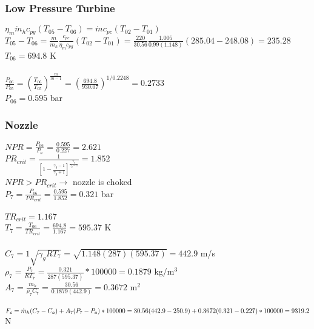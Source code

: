 \documentclass{article}
\begin{document}
\subsubsection*{Low Pressure Turbine}
$\eta_m \dot{m}_h c_{pg}(T_{05}-T_{06})=\dot{m} c_{pc}(T_{02}-T_{01})$ \\
$T_{05}-T_{06}=\frac{\dot{m}}{\dot{m}_h}\frac{c_{pc}}{\eta_m c_{pg}}(T_{02}-T_{01})=
\frac{220}{30.56}\frac{1.005}{0.99(1.148)}(285.04-248.08)=235.28$ \\
$T_{06}=694.8$ K \\\\
$\frac{P_{06}}{P_{05}}=(\frac{T_{06}}{T_{05}})^\frac{m}{m-1}=(\frac{694.8}{930.07})^
{1/0.2248}=0.2733$ \\
$P_{06}=0.595$ bar

\subsubsection*{Nozzle}
$NPR=\frac{P_{06}}{P_a}=\frac{0.595}{0.227}=2.621$ \\
$PR_{crit}=\frac{1}{[1-\frac{\gamma_g-1}{\gamma_g+1}]^\frac{\gamma_g}{\gamma_g-1}}=
1.852$ \\
$NPR>PR_{crit} \rightarrow$ nozzle is choked \\
$P_7=\frac{P_{06}}{PR_{crit}}=\frac{0.595}{1.852}=0.321$ bar \\\\
$TR_{crit}=1.167$ \\
$T_7=\frac{T_{06}}{TR_{crit}}=\frac{694.8}{1.167}=595.37$ K \\\\
$C_7=1\sqrt{\gamma_g RT_{7}}=\sqrt{1.148(287)(595.37)}=442.9$ m/s \\
$\rho_7=\frac{P_7}{RT_7}=\frac{0.321}{287(595.37)}*100000=0.1879$ kg/m$^3$ \\
$A_7=\frac{\dot{m}_h}{\rho_7 C_7}=\frac{30.56}{0.1879(442.9)}=0.3672$ m$^2$ \\\\
$F_c=\dot{m}_h(C_7-C_a)+A_7(P_7-P_a)*100000=\\
30.56(442.9-250.9)+0.3672(0.321-0.227)*100000=9319.2$ N
\end{document}

